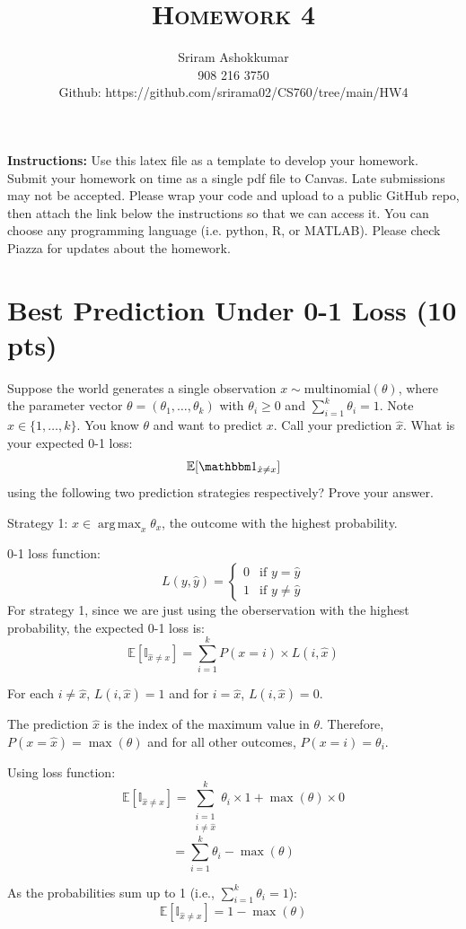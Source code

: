 \documentclass[a4paper]{article}
\title{\textsc{Homework 4}} %
\author{
Sriram Ashokkumar\\
908 216 3750\\
Github: https://github.com/srirama02/CS760/tree/main/HW4
}
\date{}
\theoremstyle{definition}
\DeclareMathOperator*{\argmax}{arg\,max}
\def\E{\mathbb E}
\def\ind{\mathbbm 1}
\newenvironment{soln}{
    \leavevmode\color{blue}\ignorespaces
}{}
\begin{document}
\maketitle 


\textbf{Instructions:} Use this latex file as a template to develop your homework. Submit your homework on time as a single pdf file to Canvas. Late submissions may not be accepted. Please wrap your code and upload to a public GitHub repo, then attach the link below the instructions so that we can access it. You can choose any programming language (i.e. python, R, or MATLAB). Please check Piazza for updates about the homework.

\section{Best Prediction Under 0-1 Loss (10 pts)}
Suppose the world generates a single observation $x \sim \mbox{multinomial}(\theta)$, where the parameter vector $\theta=(\theta_1, \ldots, \theta_k)$ with $\theta_i\ge 0$ and $\sum_{i=1}^k \theta_i=1$.  Note $x \in \{1, \ldots, k\}$.
You know $\theta$ and want to predict $x$. 
Call your prediction $\hat x$.  What is your expected 0-1 loss: 
$$\E[\ind_{\hat x \neq x}]$$
using the following two prediction strategies respectively?  Prove your answer.


Strategy 1: $\hat x \in \argmax_x \theta_x$, the outcome with the highest probability.

\begin{soln}
    0-1 loss function:
    \[
    L(y, \hat{y}) = 
    \begin{cases} 
    0 & \text{if } y = \hat{y} \\
    1 & \text{if } y \neq \hat{y} 
    \end{cases}
    \]
    For strategy 1, since we are just using the oberservation with the highest probability, the expected 0-1 loss is:
    \[
    \E[\mathbb{I}_{\hat{x} \neq x}] = \sum_{i=1}^{k} P(x = i) \times L(i, \hat{x})
    \]

    For each $i \neq \hat{x}$, $L(i, \hat{x}) = 1$ and for $i = \hat{x}$, $L(i, \hat{x}) = 0$.

    The prediction $\hat{x}$ is the index of the maximum value in $\theta$. Therefore, $P(x = \hat{x}) = \max(\theta)$ and for all other outcomes, $P(x = i) = \theta_i$.

    Using loss function:
    \[
    \E[\mathbb{I}_{\hat{x} \neq x}] = \sum_{\substack{i=1 \\ i \neq \hat{x}}}^{k} \theta_i \times 1 + \max(\theta) \times 0 
    \]
    \[
    = \sum_{i=1}^{k} \theta_i - \max(\theta)
    \]

    As the probabilities sum up to 1 (i.e., $\sum_{i=1}^{k} \theta_i = 1$):
    \[
    \E[\mathbb{I}_{\hat{x} \neq x}] = 1 - \max(\theta)
    \]
\end{soln}
\end{document}

